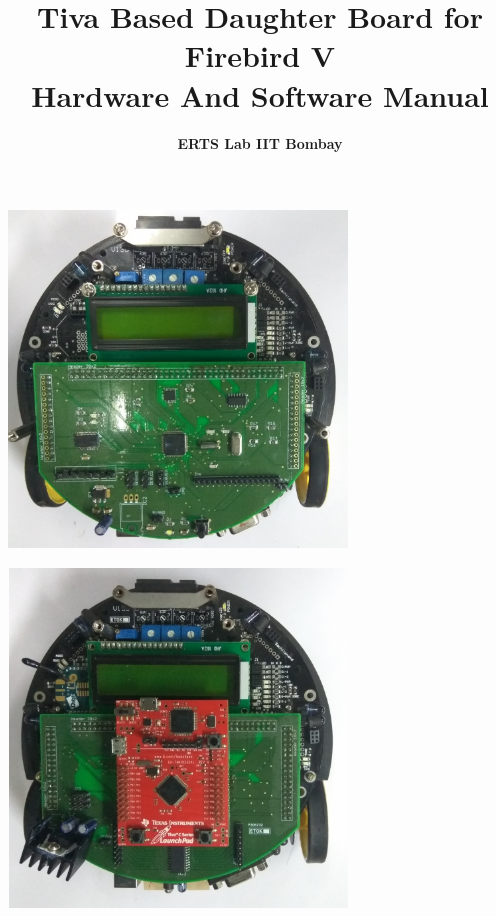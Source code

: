 \documentclass[a4paper,10pt,oneside]{article}
\title{{\textbf{Tiva Based Daughter Board for Firebird V \\ Hardware And Software Manual}}}
\author{\textbf{ ERTS Lab IIT Bombay}}
\begin{document}
	\maketitle
		\begin{center}
			\includegraphics[width=9cm, height=9cm]{Images/uC_DB} \\
		\end{center}
		
		\begin{center}
			\includegraphics[width=9cm, height=9cm]{Images/Plug_Play_DB}
		\end{center}
	
	\newpage
\end{document}
